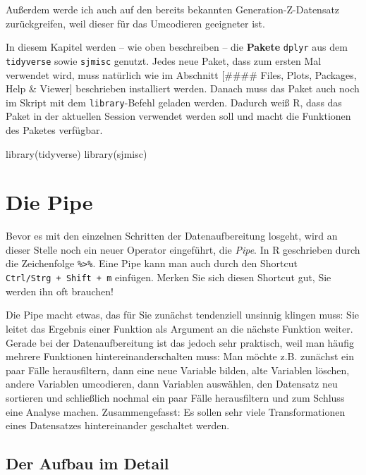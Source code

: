 \documentclass[
]{book}
\newenvironment{Shaded}{\begin{snugshade}}{\end{snugshade}}
\newcommand{\FunctionTok}[1]{\textcolor[rgb]{0.00,0.00,0.00}{#1}}
\newcommand{\NormalTok}[1]{#1}
\begin{document}
Außerdem werde ich auch auf den bereits bekannten Generation-Z-Datensatz zurückgreifen, weil dieser für das Umcodieren geeigneter ist.

In diesem Kapitel werden -- wie oben beschreiben -- die \textbf{Pakete} \texttt{dplyr} aus dem \texttt{tidyverse} sowie \texttt{sjmisc} genutzt. Jedes neue Paket, dass zum ersten Mal verwendet wird, muss natürlich wie im Abschnitt {[}\#\#\#\# Files, Plots, Packages, Help \& Viewer{]} beschrieben installiert werden. Danach muss das Paket auch noch im Skript mit dem \texttt{library}-Befehl geladen werden. Dadurch weiß R, dass das Paket in der aktuellen Session verwendet werden soll und macht die Funktionen des Paketes verfügbar.

\begin{Shaded}
\begin{Highlighting}[]
\FunctionTok{library}\NormalTok{(tidyverse)}
\FunctionTok{library}\NormalTok{(sjmisc)}
\end{Highlighting}
\end{Shaded}

\hypertarget{pipe}{%
\section{Die Pipe}\label{pipe}}

Bevor es mit den einzelnen Schritten der Datenaufbereitung losgeht, wird an dieser Stelle noch ein neuer Operator eingeführt, die \emph{Pipe}. In R geschrieben durch die Zeichenfolge \texttt{\%\textgreater{}\%}. Eine Pipe kann man auch durch den Shortcut \texttt{Ctrl/Strg\ +\ Shift\ +\ m} einfügen. Merken Sie sich diesen Shortcut gut, Sie werden ihn oft brauchen!

Die Pipe macht etwas, das für Sie zunächst tendenziell unsinnig klingen muss: Sie leitet das Ergebnis einer Funktion als Argument an die nächste Funktion weiter. Gerade bei der Datenaufbereitung ist das jedoch sehr praktisch, weil man häufig mehrere Funktionen hintereinanderschalten muss: Man möchte z.B. zunächst ein paar Fälle herausfiltern, dann eine neue Variable bilden, alte Variablen löschen, andere Variablen umcodieren, dann Variablen auswählen, den Datensatz neu sortieren und schließlich nochmal ein paar Fälle herausfiltern und zum Schluss eine Analyse machen. Zusammengefasst: Es sollen sehr viele Transformationen eines Datensatzes hintereinander geschaltet werden.

\hypertarget{der-aufbau-im-detail}{%
\subsection{Der Aufbau im Detail}\label{der-aufbau-im-detail}}
\end{document}
